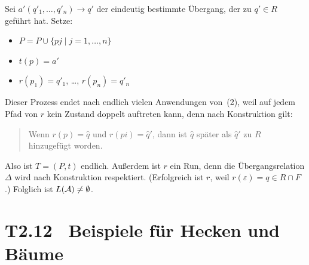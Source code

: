 \documentclass[fontsize=11pt, twoside=false, numbers=autoenddot]{scrbook}
\begin{document}
\begin{beweis}
\begin{description}
\begin{enumerate}
          Sei $a'(q'_1,\dots,q'_n) \to q'$ der eindeutig bestimmte Übergang,
          der zu $q' \in R$ geführt hat. Setze:
          \begin{itemize}
            \item
              $P = P \cup \{pj \mid j = 1,\dots,n\}$
            \item
              $t(p)=a'$
            \item 
              $r(p_1)=q'_1$, \dots, $r(p_n) = q'_n$
          \end{itemize}
      \end{enumerate}
      Dieser Prozess endet nach endlich vielen Anwendungen von~(2),
      weil auf jedem Pfad von $r$ kein Zustand doppelt auftreten kann, denn nach Konstruktion gilt:
      \begin{quote}
        Wenn $r(p) = \widehat q$ und $r(pi) = \widehat q'$, dann ist $\widehat q$ später als $\widehat q'$
        zu $R$ hinzugefügt worden.
      \end{quote}
      Also ist $T=(P,t)$ endlich.
      Außerdem ist $r$ ein Run, denn die Übergangsrelation $\Delta$ wird nach Konstruktion respektiert.
      (Erfolgreich ist $r$, weil $r(\varepsilon) = q \in R \cap F$.)
      Folglich ist $L(\mathcal{A}) \neq \emptyset$.
      \qedhere
  \end{description}
\end{beweis}

\section*{T2.12~ Beispiele für Hecken und Bäume}
\end{document}
